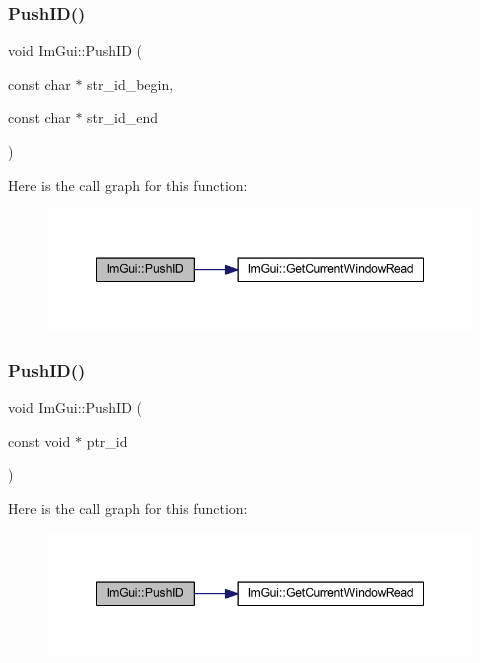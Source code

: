 \subsubsection{\texorpdfstring{Push\+I\+D()}{PushID()}\hspace{0.1cm}{\footnotesize\ttfamily [2/4]}}
{\footnotesize\ttfamily void Im\+Gui\+::\+Push\+ID (\begin{DoxyParamCaption}\item[{const char $\ast$}]{str\+\_\+id\+\_\+begin,  }\item[{const char $\ast$}]{str\+\_\+id\+\_\+end }\end{DoxyParamCaption})}

Here is the call graph for this function\+:
\nopagebreak
\begin{figure}[H]
\begin{center}
\leavevmode
\includegraphics[width=348pt]{namespace_im_gui_af5e55788830807a7c53d5dd7865b692a_cgraph}
\end{center}
\end{figure}
\mbox{\label{namespace_im_gui_af9cf42fdf2fbc5eeec7521de14996bfb}} 
\subsubsection{\texorpdfstring{Push\+I\+D()}{PushID()}\hspace{0.1cm}{\footnotesize\ttfamily [3/4]}}
{\footnotesize\ttfamily void Im\+Gui\+::\+Push\+ID (\begin{DoxyParamCaption}\item[{const void $\ast$}]{ptr\+\_\+id }\end{DoxyParamCaption})}

Here is the call graph for this function\+:
\nopagebreak
\begin{figure}[H]
\begin{center}
\leavevmode
\includegraphics[width=348pt]{namespace_im_gui_af9cf42fdf2fbc5eeec7521de14996bfb_cgraph}
\end{center}
\end{figure}
\mbox{\label{namespace_im_gui_a6a11664be2a0b9a0e7054bb339e009ac}} 
